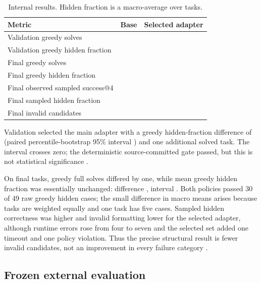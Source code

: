 \documentclass[11pt]{article}
\begin{document}
\begin{table}[ht]
\centering
\caption{Internal results. Hidden fraction is a macro-average over tasks.}
\label{tab:internal}
\begin{tabular}{@{}lrr@{}}
\toprule
Metric & Base & Selected adapter \\
\midrule
Validation greedy solves & \BaseValSolved{} & \ModelValSolved{} \\
Validation greedy hidden fraction & \BaseValHidden{} & \ModelValHidden{} \\
Final greedy solves & \BaseTestSolved{} & \ModelTestSolved{} \\
Final greedy hidden fraction & \BaseTestHidden{} & \ModelTestHidden{} \\
Final observed sampled success@4 & \BaseSampledSolve{} & \ModelSampledSolve{} \\
Final sampled hidden fraction & \BaseSampledHidden{} & \ModelSampledHidden{} \\
Final invalid candidates & \BaseInvalid{} & \ModelInvalid{} \\
\bottomrule
\end{tabular}
\end{table}

Validation selected the main adapter with a greedy hidden-fraction difference of \ValDifference{} (paired percentile-bootstrap 95\% interval \ValInterval{}) and one additional solved task. The interval crosses zero; the deterministic source-committed gate passed, but this is not statistical significance \cite{runsummary,taskscores}.

On final tasks, greedy full solves differed by one, while mean greedy hidden fraction was essentially unchanged: difference \TestDifference{}, interval \TestInterval{}. Both policies passed 30 of 49 raw greedy hidden cases; the small difference in macro means arises because tasks are weighted equally and one task has five cases. Sampled hidden correctness was higher and invalid formatting lower for the selected adapter, although runtime errors rose from four to seven and the selected set added one timeout and one policy violation. Thus the precise structural result is fewer invalid candidates, not an improvement in every failure category \cite{hubresults,taskscores}.

\subsection{Frozen external evaluation}
\end{document}
